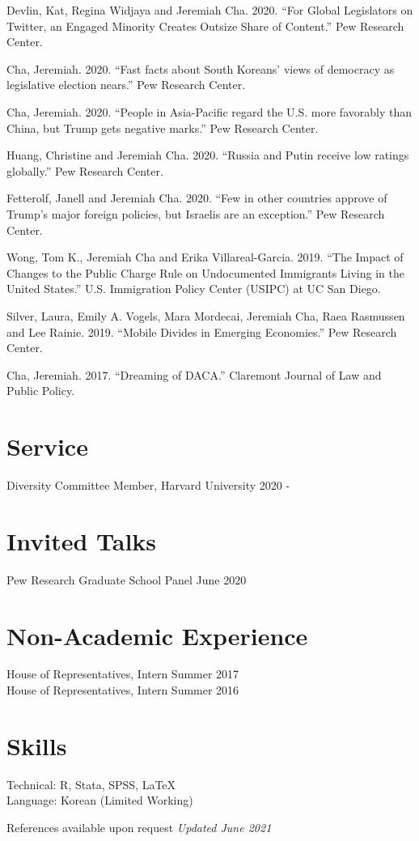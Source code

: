 \documentclass[margin, line]{res}
\begin{document}
\begin{resume}
\begin{etaremune}
	\item Devlin, Kat, Regina Widjaya and Jeremiah Cha. 2020. ``For Global Legislators on Twitter, an Engaged Minority Creates Outsize Share of Content.'' Pew Research Center.
	\item Cha, Jeremiah. 2020. ``Fast facts about South Koreans’ views of democracy as legislative election nears.'' Pew Research Center.
	\item Cha, Jeremiah. 2020. ``People in Asia-Pacific regard the U.S. more favorably than China, but Trump gets negative marks.'' Pew Research Center.
	\item Huang, Christine and Jeremiah Cha. 2020. ``Russia and Putin receive low ratings globally.'' Pew Research Center.
	\item Fetterolf, Janell and Jeremiah Cha. 2020. ``Few in other countries approve of Trump’s major foreign policies, but Israelis are an exception.'' Pew Research Center.
	\item Wong, Tom K., Jeremiah Cha and Erika Villareal-Garcia. 2019. ``The Impact of Changes to the Public Charge Rule on Undocumented Immigrants Living in the United States.'' U.S. Immigration Policy Center (USIPC) at UC San Diego.
	\item Silver, Laura, Emily A. Vogels, Mara Mordecai, Jeremiah Cha, Raea Rasmussen and Lee Rainie. 2019. ``Mobile Divides in Emerging Economies.'' Pew Research Center.
	\item Cha, Jeremiah. 2017. ``Dreaming of DACA.'' Claremont Journal of Law and Public Policy.
\end{etaremune}


\section{Service}
Diversity Committee Member, Harvard University \hfill 2020 -

\section{Invited Talks}
Pew Research Graduate School Panel \hfill June 2020

\section{Non-Academic Experience}
House of Representatives, Intern \hfill Summer 2017\\
House of Representatives, Intern \hfill Summer 2016

\section{Skills}
Technical: R, Stata, SPSS, \LaTeX\\
Language: Korean (Limited Working)

\small{References available upon request} \hfill \small{\textit{Updated June 2021}}

\end{resume}
\end{document}

